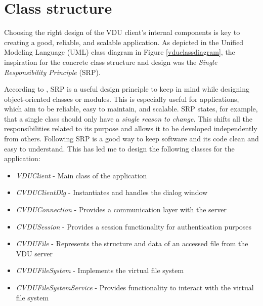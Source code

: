 \section{Class structure}
Choosing the right design of the VDU client's internal components is key to creating a good, reliable, and scalable application. As depicted in the Unified Modeling Language (UML) class diagram in Figure \ref{vduclassdiagram}, the inspiration for the concrete class structure and design was the \textit{Single Responsibility Principle} (SRP).

According to \cite{CleanCodeBook}, SRP is a useful design principle to keep in mind while designing object-oriented classes or modules. This is especially useful for applications, which aim to be reliable, easy to maintain, and scalable. SRP states, for example, that a single class should only have a \textit{single reason to change}. This shifts all the responsibilities related to its purpose and allows it to be developed independently from others. Following SRP is a good way to keep software and its code clean and easy to understand. This has led me to design the following classes for the application:
\begin{itemize}
    \item \textit{VDUClient} - Main class of the application
    \item \textit{CVDUClientDlg} - Instantiates and handles the dialog window
    \item \textit{CVDUConnection} - Provides a communication layer with the server
    \item \textit{CVDUSession} - Provides a session functionality for authentication purposes
    \item \textit{CVDUFile} - Represents the structure and data of an accessed file from the VDU server
    \item \textit{CVDUFileSystem} - Implements the virtual file system
    \item \textit{CVDUFileSystemService} - Provides functionality to interact with the virtual file system
\end{itemize}

